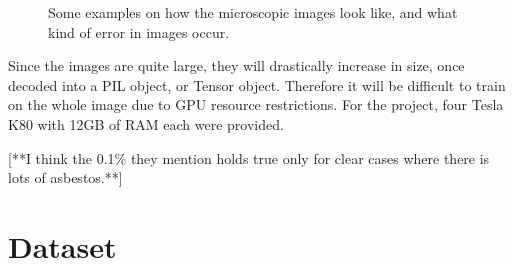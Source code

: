 \begin{figure}[t]
\centering
{}


\caption{Some examples on how the microscopic images look like, and what kind of error in images occur.}
\label{fig:basic_examples}
\end{figure}

Since the images are quite large, they will drastically increase in size, once decoded into a PIL object, or Tensor object. Therefore it will be difficult to train on the whole image due to GPU resource restrictions. For the project, four Tesla K80 with 12GB of RAM each were provided.

[**I think the 0.1\% they mention holds true only for clear cases where there is lots of asbestos.**]

\section{Dataset}

